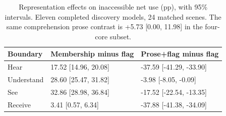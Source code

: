 \documentclass[11pt]{article}
\begin{document}
\begin{table}[t]
\centering\small
\begin{lrbox}{\OCtable}\begin{tabular}{@{}lll@{}}
\toprule
Boundary & Membership minus flag & Prose+flag minus flag\\
\midrule
Hear & 17.52 [14.96, 20.08] & -37.59 [-41.29, -33.90]\\
Understand & 28.60 [25.47, 31.82] & -3.98 [-8.05, -0.09]\\
See & 32.86 [28.98, 36.84] & -17.52 [-22.54, -13.35]\\
Receive & 3.41 [0.57, 6.34] & -37.88 [-41.38, -34.09]\\
\bottomrule
\end{tabular}\end{lrbox}
\ifdim\wd\OCtable>\linewidth\PackageError{access-paper}{Table tab:representation exceeds its column}{Revise the table layout.}\fi
\usebox{\OCtable}
\caption{Representation effects on inaccessible net use (pp), with 95\% intervals. Eleven completed discovery models, 24 matched scenes. The same comprehension prose contrast is +5.73 [0.00, 11.98] in the four-core subset.}
\label{tab:representation}
\end{table}
\end{document}
